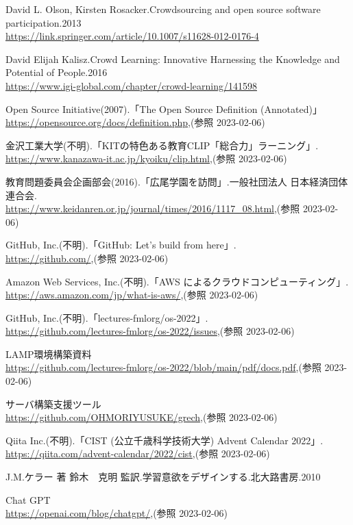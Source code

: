\documentclass[11pt, a4paper]{jreport}
\begin{document}
\begin{thebibliography}{9}
 David L. Olson, Kirsten Rosacker.Crowdsourcing and open source software participation.2013\\ \url{https://link.springer.com/article/10.1007/s11628-012-0176-4}

 David Elijah Kalisz.Crowd Learning: Innovative Harnessing the Knowledge and Potential of People.2016\\ \url{https://www.igi-global.com/chapter/crowd-learning/141598}

 Open Source Initiative(2007).「The Open Source Definition (Annotated)」\\ \url{https://opensource.org/docs/definition.php},(参照 2023-02-06)

 金沢工業大学(不明).「KITの特色ある教育CLIP「総合力」ラーニング」.\\ \url{https://www.kanazawa-it.ac.jp/kyoiku/clip.html},(参照 2023-02-06)

 教育問題委員会企画部会(2016).「広尾学園を訪問」.一般社団法人 日本経済団体連合会.\\ \url{https://www.keidanren.or.jp/journal/times/2016/1117_08.html},(参照 2023-02-06)

 GitHub, Inc.(不明).「GitHub: Let’s build from here」.\\ \url{https://github.com/},(参照 2023-02-06)


 Amazon Web Services, Inc.(不明).「AWS によるクラウドコンピューティング」.\\ \url{https://aws.amazon.com/jp/what-is-aws/},(参照 2023-02-06)

 GitHub, Inc.(不明).「lectures-fmlorg/os-2022」.\\ \url{https://github.com/lectures-fmlorg/os-2022/issues},(参照 2023-02-06)

 LAMP環境構築資料\\ \url{https://github.com/lectures-fmlorg/os-2022/blob/main/pdf/docs.pdf},(参照 2023-02-06)

 サーバ構築支援ツール\\ \url{https://github.com/OHMORIYUSUKE/grech},(参照 2023-02-06)

 Qiita Inc.(不明).「CIST (公立千歳科学技術大学) Advent Calendar 2022」.\\ \url{https://qiita.com/advent-calendar/2022/cist},(参照 2023-02-06)

 J.M.ケラー 著 鈴木　克明 監訳.学習意欲をデザインする.北大路書房.2010

 Chat GPT\\ \url{https://openai.com/blog/chatgpt/},(参照 2023-02-06)

\end{thebibliography}
\end{document}
